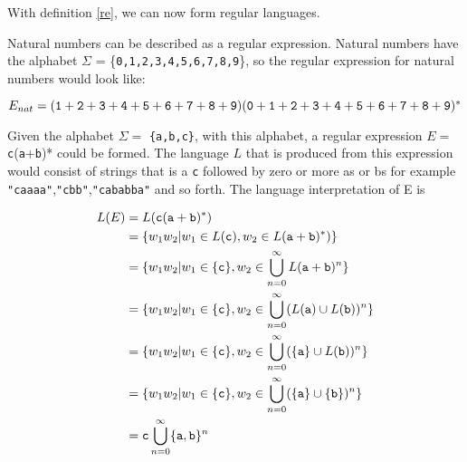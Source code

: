 With definition \ref{re}, we can now form regular languages. 
\begin{myex}Natural numbers can be described as a regular expression. Natural numbers have the alphabet $\Sigma$ = \{{\tt 0,1,2,3,4,5,6,7,8,9}\}, so the regular expression for natural numbers would look like:
\begin{center}
$E_{nat} = ({\tt 1}+{\tt 2}+{\tt 3}+{\tt 4}+{\tt 5}+{\tt 6}+{\tt 7}+{\tt 8}+{\tt 9})({\tt 0}+{\tt 1}+{\tt 2}+{\tt 3}+{\tt 4}+{\tt 5}+{\tt 6}+{\tt 7}+{\tt 8}+{\tt 9})^*$
\end{center}
\end{myex}

\begin{myex}
Given the alphabet $\Sigma =$ {\tt\{a,b,c\}}, with this alphabet, a regular expression $E =$ {\tt c}({\tt a}+{\tt b})* could be formed. The language $L$ that is produced from this expression would consist of strings that is a {\tt c} followed by zero or more as or bs for example {\tt "caaaa"},{\tt "cbb"},{\tt "cababba"} and so forth. The language interpretation of E is 
\begin{center}
\begin{align*}
L(E) &= L({\tt c}({\tt a}+{\tt b})^*)\\
	 &= \{w_1 w_2|w_1 \in L({\tt c}),w_2 \in L({\tt a}+{\tt b})^*)\}\\
	 &= \{w_1 w_2|w_1 \in \{{\tt c}\}, w_2 \in \bigcup\limits_{n=0}^\infty L({\tt a}+{\tt b})^n \}\\
	 &= \{w_1 w_2|w_1 \in \{{\tt c}\}, w_2 \in \bigcup\limits_{n=0}^\infty (L({\tt a}) \cup L({\tt b}))^n \}\\
	 &= \{w_1 w_2|w_1 \in \{{\tt c}\}, w_2 \in \bigcup\limits_{n=0}^\infty (\{{\tt a}\} \cup L({\tt b}))^n \}\\
	 &= \{w_1 w_2|w_1 \in \{{\tt c}\}, w_2 \in \bigcup\limits_{n=0}^\infty (\{{\tt a}\} \cup \{{\tt b}\})^n \}\\
	 &= {\tt c} \bigcup\limits_{n=0}^\infty \{{\tt a,b}\}^n 
\end{align*}
\end{center}
\label{reinter}
\end{myex}